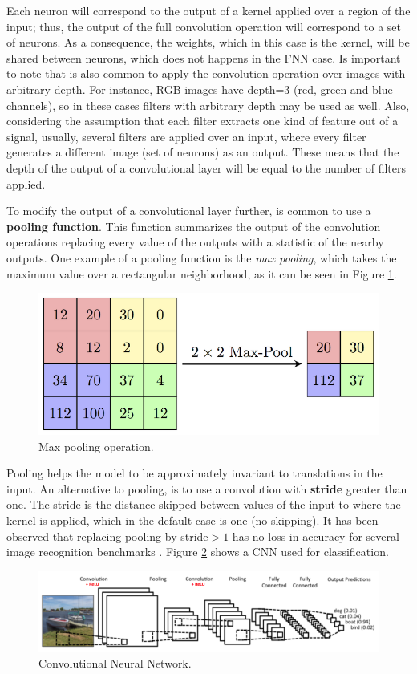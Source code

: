 \begin{enumerate}
Each neuron will correspond to the output of a kernel applied over a region of the input; thus, the output of the full convolution operation will correspond to a set of neurons. As a consequence, the weights, which in this case is the kernel, will be shared between neurons, which does not happens in the FNN case. Is important to note that is also common to apply the convolution operation over images with arbitrary depth. For instance, RGB images have depth=3 (red, green and blue channels), so in these cases filters with arbitrary depth may be used as well. Also, considering the assumption that each filter extracts one kind of feature out of a signal, usually, several filters are applied over an input, where every filter generates a different image (set of neurons) as an output. These means that the depth of the output of a convolutional layer will be equal to the number of filters applied.

To modify the output of a convolutional layer further, is common to use a \textbf{pooling function}. This function summarizes the output of the convolution operations replacing every value of the outputs with a statistic of the nearby outputs. One example of a pooling function is the \emph{max pooling}, which takes the maximum value over a rectangular neighborhood, as it can be seen in Figure \ref{fig:maxpool}. 

\begin{figure}[H]
    \centering
    \includegraphics[width=0.4\linewidth]{imagenes/cap1/max_pool.png}
    \caption{Max pooling operation.}
    \label{fig:maxpool}
\end{figure}

Pooling helps the model to be approximately invariant to translations in the input. An alternative to pooling, is to use a convolution with \textbf{stride} greater than one. The stride is the distance skipped between values of the input to where the kernel is applied, which in the default case is one (no skipping). It has been observed that replacing pooling by stride$>1$ has no loss in accuracy for several image recognition benchmarks \cite{springenberg2014striving}. Figure \ref{fig:cnn} shows a CNN used for classification.
    
\begin{figure}[H]
\centering
\includegraphics[width=0.9\linewidth]{imagenes/cap1/cnn.png}
\caption{Convolutional Neural Network.}
\label{fig:cnn}
\end{figure}


\end{enumerate}
